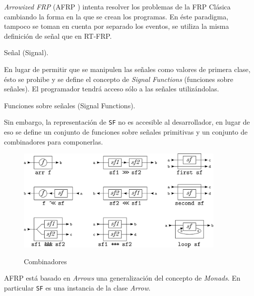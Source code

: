 
  \textit{Arrowized FRP} (AFRP
\cite{nilsson2002:arrows} \cite{hudak2002:arrows}) intenta
resolver los problemas de la FRP Clásica cambiando la forma
en la que se crean los programas.
  En éste paradigma, tampoco se toman en cuenta por separado los
eventos, se utiliza la misma definición de señal que en RT-FRP.

\begin{definicion}
  Señal (Signal).
\end{definicion}

  En lugar de permitir que se manipulen las señales como valores
de primera clase, ésto se prohibe y se define el concepto de
\textit{Signal Functions} (funciones sobre señales). El programador
tendrá acceso sólo a las señales utilizándolas.

\begin{definicion}
  Funciones sobre señales (Signal Functions).
\end{definicion}

  Sin embargo, la representación de \texttt{SF} no es accesible al
desarrollador, en lugar de eso se define un conjunto de funciones
sobre señales primitivas y un conjunto de combinadores
 para componerlas.

\begin{figure}[h]
\begin{center}
\caption{Combinadores}
\includegraphics[width=0.9\textwidth]{graphs/yampasf.png}
\label{fig:arrowcombinators}
\end{center}
\end{figure}

  AFRP está basado en \textit{Arrows} \cite{hughes1998:arrows}
una generalización del concepto de \textit{Monads}. En particular
\texttt{SF} es una instancia de la clase \textit{Arrow}.

